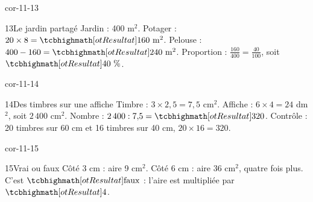 \begin{blocLivre}{cor-11-13}\begin{corrige}{13}{Le jardin partagé}
Jardin : 400 m$^2$. Potager : $20\times8=\res{160\ \mathrm{m}^2}$. Pelouse : $400-160=\res{240\ \mathrm{m}^2}$. Proportion : $\frac{160}{400}=\frac{40}{100}$, soit $\res{40\text{~\%}}$.
\label{fig-cor-11-13}
\end{corrige}\end{blocLivre}
\begin{blocLivre}{cor-11-14}\begin{corrige}{14}{Des timbres sur une affiche}
Timbre : $3\times2{,}5=7{,}5$ cm$^2$. Affiche : $6\times4=24$ dm$^2$, soit $2\,400$ cm$^2$. Nombre : $2\,400:7{,}5=\res{320}$. Contrôle : 20 timbres sur 60 cm et 16 timbres sur 40 cm, $20\times16=320$.
\end{corrige}\end{blocLivre}
\begin{blocLivre}{cor-11-15}\begin{corrige}{15}{Vrai ou faux}
Côté 3 cm : aire 9 cm$^2$. Côté 6 cm : aire 36 cm$^2$, quatre fois plus. C’est $\res{\text{faux}}$ : l’aire est multipliée par $\res4$.
\end{corrige}\end{blocLivre}
